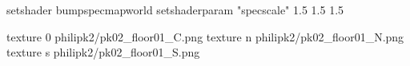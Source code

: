 setshader bumpspecmapworld
setshaderparam "specscale" 1.5 1.5 1.5

texture 0 philipk2/pk02_floor01_C.png
texture n philipk2/pk02_floor01_N.png
texture s philipk2/pk02_floor01_S.png

